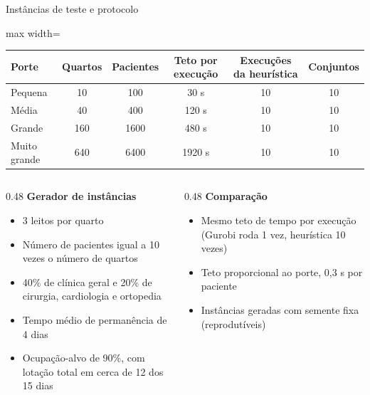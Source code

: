 \documentclass[aspectratio=169,10pt]{beamer}
\newcommand{\framerefs}{}
\newcommand{\slidecites}[1]{\gdef\framerefs{Referências: \cite{#1}}}
\gdef\framerefs{}%
\begin{document}
\begin{frame}{Instâncias de teste e protocolo}
    \slidecites{brandeau2004operations, he2019systematic, demeester2010hybrid}
    \centering
    \small
    \begin{adjustbox}{max width=\textwidth}
    \begin{tabular}{lccccc}
        \toprule
        \textbf{Porte} & \textbf{Quartos} & \textbf{Pacientes} & \textbf{Teto por execução} & \textbf{Execuções da heurística} & \textbf{Conjuntos} \\
        \midrule
        Pequena      & 10  & 100  & 30 s   & 10 & 10 \\
        Média        & 40  & 400  & 120 s  & 10 & 10 \\
        Grande       & 160 & 1600 & 480 s  & 10 & 10 \\
        Muito grande & 640 & 6400 & 1920 s & 10 & 10 \\
        \bottomrule
    \end{tabular}
    \end{adjustbox}

    \vspace{0.4cm}
    \normalsize
    \begin{columns}[t]
        \begin{column}{0.48\textwidth}
            \textbf{Gerador de instâncias}
            \begin{itemize}
                \item 3 leitos por quarto
                \item Número de pacientes igual a 10 vezes o número de quartos
                \item 40\% de clínica geral e 20\% de cirurgia, cardiologia e ortopedia
                \item Tempo médio de permanência de 4 dias
                \item Ocupação-alvo de 90\%, com lotação total em cerca de 12 dos 15 dias
            \end{itemize}
        \end{column}
        \begin{column}{0.48\textwidth}
            \textbf{Comparação}
            \begin{itemize}
                \item Mesmo teto de tempo por execução (Gurobi roda 1 vez, heurística 10 vezes)
                \item Teto proporcional ao porte, 0,3 s por paciente
                \item Instâncias geradas com semente fixa (reprodutíveis)
            \end{itemize}
        \end{column}
    \end{columns}
\end{frame}
\end{document}
